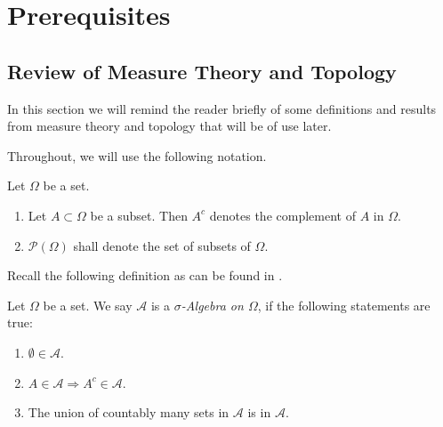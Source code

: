 \chapter{Prerequisites}
\section{Review of Measure Theory and Topology}

In this section we will remind the reader briefly of some definitions and results from measure theory and topology that will be of use later.

Throughout, we will use the following notation.
\begin{notation}Let $\Omega$ be a set.
	\begin{enumerate}
		\item Let $A\subset \Omega$ be a subset. Then $A^c$ denotes the complement of $A$ in $\Omega$.
		\item $\mathcal{P}(\Omega)$ shall denote the set of subsets of $\Omega$. 
	\end{enumerate}
\end{notation}
\noindent Recall the following definition as can be found in \cite{friedl:ana-3}.

\begin{definition}
	Let $\Omega$ be a set. We say $\mathcal{A}$ is a \emph{$\sigma$-Algebra on $\Omega$}, if the following statements are true:
	\begin{enumerate}
		\item $\emptyset\in \mathcal{A}$.
		\item $A\in \mathcal{A}\Rightarrow A^c\in \mathcal{A}$.
		\item The union of countably many sets in $\mathcal{A}$ is in $\mathcal{A}$.
	\end{enumerate}
\end{definition}

